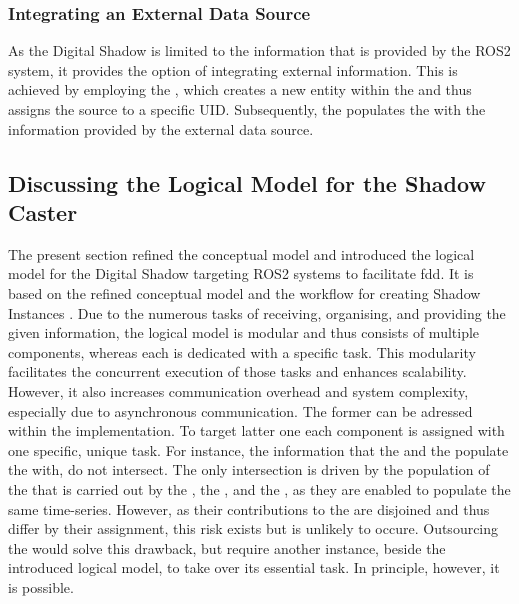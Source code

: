             \subsubsection{Integrating an External Data Source}
            As the Digital Shadow is limited to the information that is provided by the ROS2 system, it provides the option of integrating external information. This is achieved by employing the , which creates a new entity within the  and thus assigns the source to a specific UID. Subsequently, the  populates the  with the information provided by the external data source.


        \subsection{Discussing the Logical Model for the Shadow Caster} \label{subsec:dshadow:logical:discussion}
        The present section refined the conceptual model and introduced the logical model for the Digital Shadow targeting ROS2 systems to facilitate \acl{fdd}. It is based on the refined conceptual model and the workflow for creating Shadow Instances \cite{DSConceptualModelSpringer}. Due to the numerous tasks of receiving, organising, and providing the given information, the logical model is modular and thus consists of multiple components, whereas each is dedicated with a specific task. This modularity facilitates the concurrent execution of those tasks and enhances scalability. However, it also increases communication overhead and system complexity, especially due to asynchronous communication. The former can be adressed within the implementation. To target latter one each component is assigned with one specific, unique task. For instance, the information that the  and the  populate the  with, do not intersect. The only intersection is driven by the population of the  that is carried out by the , the , and the , as they are enabled to populate the same time-series. However, as their contributions to the  are disjoined and thus differ by their assignment, this risk exists but is unlikely to occure. Outsourcing the  would solve this drawback, but require another instance, beside the introduced logical model, to take over its essential task. In principle, however, it is possible.

